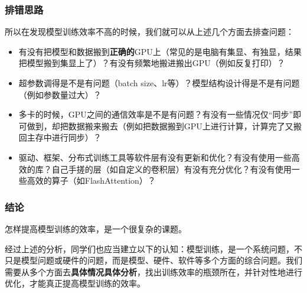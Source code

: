 \documentclass{ctexbeamer}
\begin{document}
\begin{frame}
    \frametitle{排错思路}

    所以在发现模型训练效率不高的时候，我们就可以从上述几个方面去排查问题：
    \begin{itemize}
        \item 有没有把模型和数据搬到\textbf{正确的}GPU上（常见的是电脑有集显、有独显，结果把模型搬到集显上了）？有没有频繁地搬进搬出GPU（例如反复打印）？
        \item 超参数调得是不是有问题（batch size、lr等）？模型结构设计得是不是有问题（例如参数量过大）？
        \item 多卡的时候，GPU之间的通信效率是不是有问题？有没有一些情况仅“同步”即可做到，却把数据搬来搬去（例如把数据搬到GPU上进行计算，计算完了又搬回主存中进行同步）？
        \item 驱动、框架、分布式训练工具等软件层有没有更新和优化？有没有使用一些高效的库？自己手搓的层（如自定义的卷积层）有没有充分优化？有没有使用一些高效的算子（如FlashAttention）？
    \end{itemize}

\end{frame}

\begin{frame}
    \frametitle{结论}

    怎样提高模型训练的效率，是一个很复杂的课题。

    经过上述的分析，同学们也应当建立以下的认知：模型训练，是一个系统问题，不只是模型问题或硬件的问题，而是模型、硬件、软件等多个方面的综合问题。我们需要从多个方面去\textbf{具体情况具体分析}，找出训练效率的瓶颈所在，并针对性地进行优化，才能真正提高模型训练的效率。
    
\end{frame}
\end{document}
